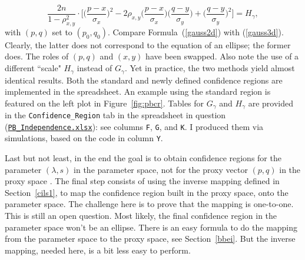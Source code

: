 \documentclass[10pt]{article}
\begin{document}
\begin{Exercise}
\begin{equation}
\frac{2n}{1-\rho_{x,y}^2}\cdot
\Big[\Big( \frac{p-x}{\sigma_x}\Big)^2
-2\rho_{x,y}\Big(\frac{p-x}{\sigma_x}\Big)\Big(\frac{q-y}{\sigma_y}\Big)
+ \Big(\frac{q-y}{\sigma_y}\Big)^2\Big] = H_\gamma,\label{gauss3d}
\end{equation}
 with $(p,q)$ set to $(p_0,q_0)$. Compare Formula~(\ref{gauss2d}) with (\ref{gauss3d}). Clearly, the latter does not correspond to the equation of an ellipse; the former does. The roles of $(p,q)$ and $(x,y)$ have been swapped. Also note the use of a different ``scale" $H_\gamma$
 instead of $G_\gamma$. Yet in practice, the two methods yield almost identical results. Both the standard and newly defined confidence regions are implemented in the
spreadsheet.  An example using the standard region is featured on the left plot in Figure~\ref{fig:pbcr}. Tables for $G_\gamma$ and $H_\gamma$ are provided
in the \texttt{Confidence\_Region} tab in the spreadsheet in question
(\href{https://github.com/VincentGranville/Point-Processes/tree/main/Spreadsheets}{\texttt{PB\_Independence.xlsx}}): see columns \texttt{F}, \texttt{G}, and \texttt{K}. I produced them via simulations, based on the code
in column \texttt{Y}.

Last but not least, in the end the goal is to obtain confidence regions for the parameter $(\lambda,s)$ in the parameter space, not for the proxy
vector $(p,q)$ in the proxy space . The final step consists of using the inverse mapping defined in Section~\ref{cils1}, to map the confidence region built in the proxy space, onto the parameter space. The challenge here is to
prove that the mapping is one-to-one. This is still an open question. Most likely, the final confidence region in the parameter space won't be an ellipse. There is an easy formula to do the mapping from the parameter space to the proxy space, see Section~\ref{bbei}. But the inverse mapping, needed here, is a bit less easy to perform.
\end{Exercise}
\end{document}
